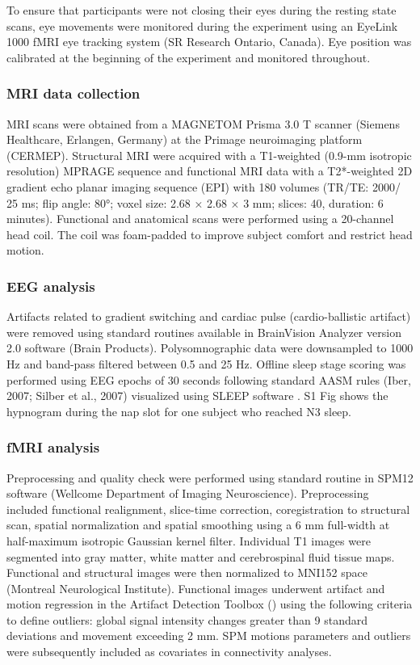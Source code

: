To ensure that participants were not closing their eyes during the resting state scans, eye movements were monitored during the experiment using an EyeLink 1000 fMRI eye tracking system (SR Research Ontario, Canada). Eye position was calibrated at the beginning of the experiment and monitored throughout.

\subsubsection*{MRI data collection}
MRI scans were obtained from a MAGNETOM Prisma 3.0 T scanner (Siemens Healthcare, Erlangen, Germany) at the Primage neuroimaging platform (CERMEP). Structural MRI were acquired with a T1-weighted (0.9-mm isotropic resolution) MPRAGE sequence and functional MRI data with a T2*-weighted 2D gradient echo planar imaging sequence (EPI) with 180 volumes (TR/TE: 2000/ 25 ms; flip angle: 80°; voxel size: 2.68 × 2.68 × 3 mm; slices: 40, duration: 6 minutes). Functional and anatomical scans were performed using a 20-channel head coil. The coil was foam-padded to improve subject comfort and restrict head motion.

\subsubsection*{EEG analysis}
Artifacts related to gradient switching and cardiac pulse (cardio-ballistic artifact) were removed using standard routines available in BrainVision Analyzer version 2.0 software (Brain Products). Polysomnographic data were downsampled to 1000 Hz and band-pass filtered between 0.5 and 25 Hz. Offline sleep stage scoring was performed using EEG epochs of 30 seconds following standard AASM rules (Iber, 2007; Silber et al., 2007) visualized using SLEEP software \citep{combrisson_sleep:_2017}. S1 Fig shows the hypnogram during the nap slot for one subject who reached N3 sleep.

\subsubsection*{fMRI analysis}
Preprocessing and quality check were performed using standard routine in SPM12 software (Wellcome Department of Imaging Neuroscience). Preprocessing included functional realignment, slice-time correction, coregistration to structural scan, spatial normalization and spatial smoothing using a 6 mm full-width at half-maximum isotropic Gaussian kernel filter. Individual T1 images were segmented into gray matter, white matter and cerebrospinal fluid tissue maps. Functional and structural images were then normalized to MNI152 space (Montreal Neurological Institute). Functional images underwent artifact and motion regression in the Artifact Detection Toolbox () using the following criteria to define outliers: global signal intensity changes greater than 9 standard deviations and movement exceeding 2 mm. SPM motions parameters and outliers were subsequently included as covariates in connectivity analyses.

